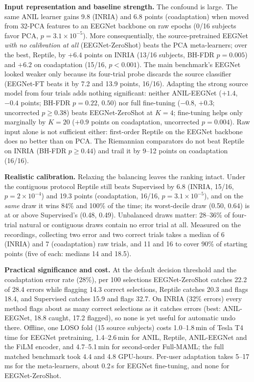 \documentclass[conference,a4paper]{IEEEtran}
\begin{document}
\textbf{Input representation and baseline strength.} The confound is large. The
same ANIL learner gains 9.8 (INRIA) and 6.8 points (coadaptation) when moved from 32-PCA
features to an EEGNet backbone on raw epochs (0/16 subjects favor PCA, $p=3.1{\times}10^{-5}$).
More consequentially, the source-pretrained EEGNet \emph{with no calibration at all}
(EEGNet-ZeroShot) beats the PCA meta-learners; over the best, Reptile, by $+6.4$ points on INRIA
(13/16 subjects, BH-FDR $p=0.005$) and $+6.2$ on coadaptation (15/16, $p<0.001$). The
main benchmark's EEGNet looked weaker only because its four-trial probe discards the
source classifier (EEGNet-FT beats it by 7.2 and 13.9 points, 16/16). Adapting the
strong source model from four trials adds nothing significant: neither ANIL-EEGNet
($+1.4$, $-0.4$ points; BH-FDR $p=0.22$, $0.50$) nor full fine-tuning ($-0.8$, $+0.3$;
uncorrected $p\ge0.38$) beats EEGNet-ZeroShot at $K{=}4$; fine-tuning helps only marginally by $K{=}20$ ($+0.9$ points on coadaptation, uncorrected $p{=}0.004$). Raw input alone is not
sufficient either: first-order Reptile on the EEGNet backbone does no better than on PCA.
The Riemannian comparators do not beat Reptile on INRIA (BH-FDR $p\ge0.44$) and trail it by
9--12 points on coadaptation (16/16).

\textbf{Realistic calibration.} Relaxing the balancing leaves the ranking intact.
Under the contiguous protocol Reptile still beats Supervised by 6.8 (INRIA, 15/16,
$p=2{\times}10^{-4}$) and 19.3 points (coadaptation, 16/16, $p=3.1{\times}10^{-5}$), and
on the \emph{same} draw it wins 84\% and 100\% of the time; its worst-decile draw
(0.50, 0.64) is at or above Supervised's (0.48, 0.49). Unbalanced draws matter:
28--36\% of four-trial natural or contiguous draws contain no error trial at all.
Measured on the recordings, collecting two error and two correct trials takes a median
of 6 (INRIA) and 7 (coadaptation) raw trials, and 11 and 16 to cover 90\% of starting
points (five of each: medians 14 and 18.5).

\textbf{Practical significance and cost.} At the default decision threshold and the
coadaptation error rate (28\%), per 100 selections EEGNet-ZeroShot catches 22.2 of
28.4 errors while flagging 14.3 correct selections, Reptile catches 20.3 and flags 18.4,
and Supervised catches 15.9 and flags 32.7. On INRIA (32\% errors) every method flags
about as many correct selections as it catches errors (best: ANIL-EEGNet, 18.8 caught,
17.2 flagged), so none is yet useful for automatic undo there. Offline, one LOSO fold
(15 source subjects) costs 1.0--1.8\,min of Tesla T4 time for EEGNet pretraining,
1.4--2.6\,min for ANIL, Reptile, ANIL-EEGNet and the FiLM encoder, and 4.7--5.1\,min for
second-order Full-MAML; the full matched benchmark took 4.4 and 4.8 GPU-hours.
Per-user adaptation takes 5--17\,ms for the meta-learners, about 0.2\,s for EEGNet
fine-tuning, and none for EEGNet-ZeroShot.
\end{document}
